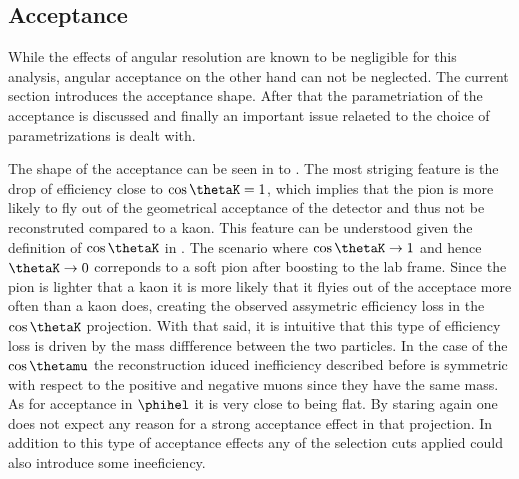 \subsection{Acceptance}
\label{Accceptance}
While the effects of angular resolution are known to be negligible for this analysis, angular acceptance on the other hand can
not be neglected. The current section introduces the acceptance shape. After that the parametriation of the acceptance is discussed
and finally an important issue relaeted to the choice of parametrizations is dealt with.

The shape of the acceptance can be seen in  to . The most striging feature is the drop of efficiency 
close to $\cos\thetaK=1$, which implies that the pion is more likely to fly out of the geometrical acceptance of the detector
and thus not be reconstruted compared to a kaon. This feature can be understood given the  definition of $\cos\thetaK$ in . 
The scenario where $\cos\thetaK\rightarrow 1$ and hence $\thetaK \rightarrow 0$ correponds to a soft pion after boosting
to the lab frame. Since the pion is lighter that a kaon it is more likely that it flyies out of the acceptace more
often than a kaon does, creating the observed assymetric efficiency loss in the $\cos\thetaK$ projection. With that said, it is intuitive that
this type of efficiency loss is driven by the mass diffference between the two particles. In the case of the $\cos\thetamu$ the
reconstruction iduced inefficiency described before is symmetric with respect to the positive and negative muons since they have the same mass.
As for acceptance in $\phihel$ it is very close to being flat. By staring again  one does not expect any
reason for a strong acceptance effect in that projection. In addition to this type of acceptance effects any of the selection 
cuts applied could also introduce some ineeficiency.  

